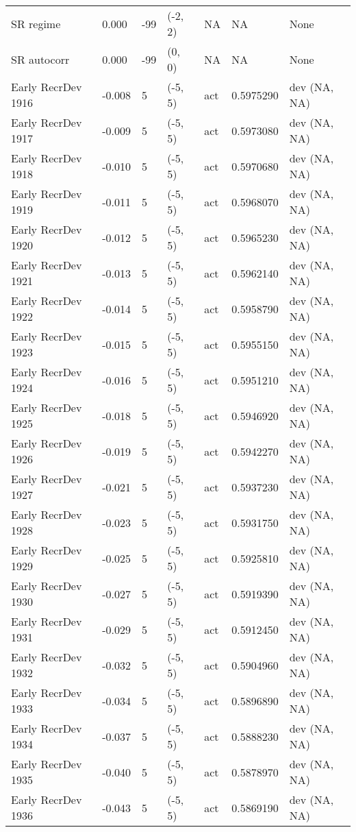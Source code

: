 \documentclass[11pt,
  english,
  letterpaper,
]{article}
\begin{document}
\begin{landscape}
\begin{longtable}[t]{>{\raggedright\arraybackslash}p{7cm}lllll>{\raggedright\arraybackslash}p{4cm}}
SR regime & 0.000 & -99 & (-2, 2) & NA & NA & None\\
SR autocorr & 0.000 & -99 & (0, 0) & NA & NA & None\\
Early RecrDev 1916 & -0.008 & 5 & (-5, 5) & act & 0.5975290 & dev (NA, NA)\\
Early RecrDev 1917 & -0.009 & 5 & (-5, 5) & act & 0.5973080 & dev (NA, NA)\\
Early RecrDev 1918 & -0.010 & 5 & (-5, 5) & act & 0.5970680 & dev (NA, NA)\\
Early RecrDev 1919 & -0.011 & 5 & (-5, 5) & act & 0.5968070 & dev (NA, NA)\\
Early RecrDev 1920 & -0.012 & 5 & (-5, 5) & act & 0.5965230 & dev (NA, NA)\\
Early RecrDev 1921 & -0.013 & 5 & (-5, 5) & act & 0.5962140 & dev (NA, NA)\\
Early RecrDev 1922 & -0.014 & 5 & (-5, 5) & act & 0.5958790 & dev (NA, NA)\\
Early RecrDev 1923 & -0.015 & 5 & (-5, 5) & act & 0.5955150 & dev (NA, NA)\\
Early RecrDev 1924 & -0.016 & 5 & (-5, 5) & act & 0.5951210 & dev (NA, NA)\\
Early RecrDev 1925 & -0.018 & 5 & (-5, 5) & act & 0.5946920 & dev (NA, NA)\\
Early RecrDev 1926 & -0.019 & 5 & (-5, 5) & act & 0.5942270 & dev (NA, NA)\\
Early RecrDev 1927 & -0.021 & 5 & (-5, 5) & act & 0.5937230 & dev (NA, NA)\\
Early RecrDev 1928 & -0.023 & 5 & (-5, 5) & act & 0.5931750 & dev (NA, NA)\\
Early RecrDev 1929 & -0.025 & 5 & (-5, 5) & act & 0.5925810 & dev (NA, NA)\\
Early RecrDev 1930 & -0.027 & 5 & (-5, 5) & act & 0.5919390 & dev (NA, NA)\\
Early RecrDev 1931 & -0.029 & 5 & (-5, 5) & act & 0.5912450 & dev (NA, NA)\\
Early RecrDev 1932 & -0.032 & 5 & (-5, 5) & act & 0.5904960 & dev (NA, NA)\\
Early RecrDev 1933 & -0.034 & 5 & (-5, 5) & act & 0.5896890 & dev (NA, NA)\\
Early RecrDev 1934 & -0.037 & 5 & (-5, 5) & act & 0.5888230 & dev (NA, NA)\\
Early RecrDev 1935 & -0.040 & 5 & (-5, 5) & act & 0.5878970 & dev (NA, NA)\\
Early RecrDev 1936 & -0.043 & 5 & (-5, 5) & act & 0.5869190 & dev (NA, NA)\\

\end{longtable}
\end{landscape}
\end{document}
